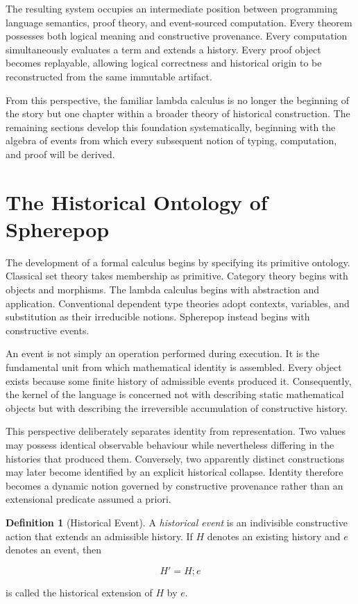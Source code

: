 \documentclass[12pt,oneside]{article}
\theoremstyle{definition}
\newtheorem{definition}[theorem]{Definition}
\theoremstyle{remark}
\begin{document}
The resulting system occupies an intermediate position between programming language semantics, proof theory, and event-sourced computation. Every theorem possesses both logical meaning and constructive provenance. Every computation simultaneously evaluates a term and extends a history. Every proof object becomes replayable, allowing logical correctness and historical origin to be reconstructed from the same immutable artifact.

From this perspective, the familiar lambda calculus is no longer the beginning of the story but one chapter within a broader theory of historical construction. The remaining sections develop this foundation systematically, beginning with the algebra of events from which every subsequent notion of typing, computation, and proof will be derived.

\section{The Historical Ontology of Spherepop}

The development of a formal calculus begins by specifying its primitive ontology. Classical set theory takes membership as primitive. Category theory begins with objects and morphisms. The lambda calculus begins with abstraction and application. Conventional dependent type theories adopt contexts, variables, and substitution as their irreducible notions. Spherepop instead begins with constructive events.

An event is not simply an operation performed during execution. It is the fundamental unit from which mathematical identity is assembled. Every object exists because some finite history of admissible events produced it. Consequently, the kernel of the language is concerned not with describing static mathematical objects but with describing the irreversible accumulation of constructive history.

This perspective deliberately separates identity from representation. Two values may possess identical observable behaviour while nevertheless differing in the histories that produced them. Conversely, two apparently distinct constructions may later become identified by an explicit historical collapse. Identity therefore becomes a dynamic notion governed by constructive provenance rather than an extensional predicate assumed a priori.

\begin{definition}[Historical Event]
A \emph{historical event} is an indivisible constructive action that extends an admissible history. If $H$ denotes an existing history and $e$ denotes an event, then

\[
H' = H ; e
\]

is called the historical extension of $H$ by $e$.
\end{definition}
\end{document}
